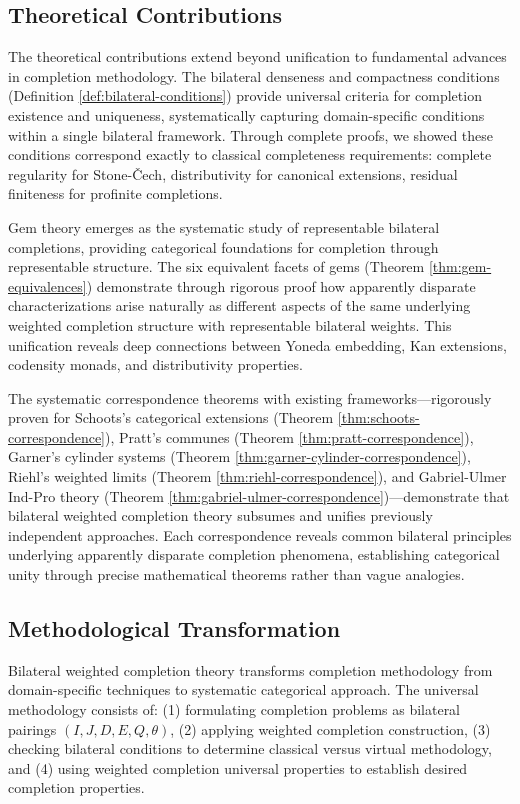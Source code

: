 \documentclass[11pt]{article}
\theoremstyle{plain}
\theoremstyle{definition}
\theoremstyle{remark}
\begin{document}
\subsection{Theoretical Contributions}

The theoretical contributions extend beyond unification to fundamental advances in completion methodology. The bilateral denseness and compactness conditions (Definition \ref{def:bilateral-conditions}) provide universal criteria for completion existence and uniqueness, systematically capturing domain-specific conditions within a single bilateral framework. Through complete proofs, we showed these conditions correspond exactly to classical completeness requirements: complete regularity for Stone-\v{C}ech, distributivity for canonical extensions, residual finiteness for profinite completions.

Gem theory emerges as the systematic study of representable bilateral completions, providing categorical foundations for completion through representable structure. The six equivalent facets of gems (Theorem \ref{thm:gem-equivalences}) demonstrate through rigorous proof how apparently disparate characterizations arise naturally as different aspects of the same underlying weighted completion structure with representable bilateral weights. This unification reveals deep connections between Yoneda embedding, Kan extensions, codensity monads, and distributivity properties.

The systematic correspondence theorems with existing frameworks—rigorously proven for Schoots's categorical extensions (Theorem \ref{thm:schoots-correspondence}), Pratt's communes (Theorem \ref{thm:pratt-correspondence}), Garner's cylinder systems (Theorem \ref{thm:garner-cylinder-correspondence}), Riehl's weighted limits (Theorem \ref{thm:riehl-correspondence}), and Gabriel-Ulmer Ind-Pro theory (Theorem \ref{thm:gabriel-ulmer-correspondence})—demonstrate that bilateral weighted completion theory subsumes and unifies previously independent approaches. Each correspondence reveals common bilateral principles underlying apparently disparate completion phenomena, establishing categorical unity through precise mathematical theorems rather than vague analogies.

\subsection{Methodological Transformation}

Bilateral weighted completion theory transforms completion methodology from domain-specific techniques to systematic categorical approach. The universal methodology consists of: (1) formulating completion problems as bilateral pairings $(I, J, D, E, Q, \theta)$, (2) applying weighted completion construction, (3) checking bilateral conditions to determine classical versus virtual methodology, and (4) using weighted completion universal properties to establish desired completion properties.
\end{document}
